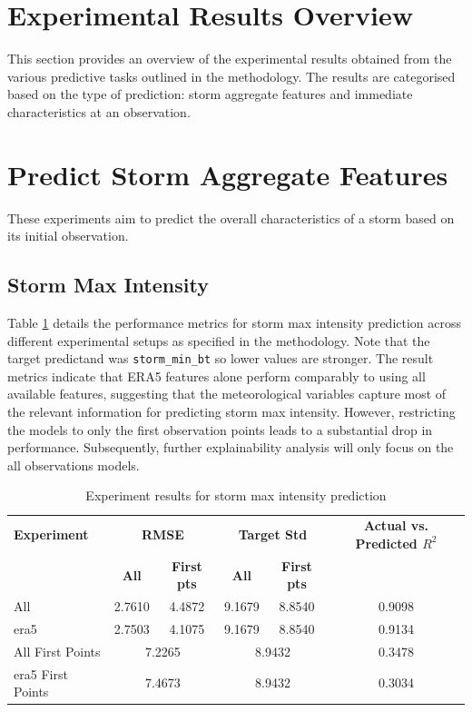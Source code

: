 \section{Experimental Results Overview}

This section provides an overview of the experimental results obtained from the various predictive tasks outlined in the methodology. The results are categorised based on the type of prediction: storm aggregate features and immediate characteristics at an observation. 

\section{Predict Storm Aggregate Features}

These experiments aim to predict the overall characteristics of a storm based on its initial observation.

\subsection{Storm Max Intensity}

Table \ref{tab:storm_max_intensity_results} details the performance metrics for storm max intensity prediction across different experimental setups as specified in the methodology. Note that the target predictand was \texttt{storm\_min\_bt} so lower values are stronger. The result metrics indicate that ERA5 features alone perform comparably to using all available features, suggesting that the meteorological variables capture most of the relevant information for predicting storm max intensity. However, restricting the models to only the first observation points leads to a substantial drop in performance. Subsequently, further explainability analysis will only focus on the all observations models.

\begin{table}[ht]
\centering
\caption{Experiment results for storm max intensity prediction}
\label{tab:storm_max_intensity_results}
\begin{tabular}{lccccc}
\hline
\textbf{Experiment} & \multicolumn{2}{c}{\textbf{RMSE}} & \multicolumn{2}{c}{\textbf{Target Std}} & \textbf{Actual vs. Predicted $R^2$} \\
\cline{2-5}
 & \textbf{All} & \textbf{First pts} & \textbf{All} & \textbf{First pts} &  \\
\hline
All              & 2.7610 & 4.4872 & 9.1679 & 8.8540 & 0.9098 \\
\acrshort{era5}             & 2.7503 & 4.1075 & 9.1679 & 8.8540 & 0.9134 \\
All First Points & \multicolumn{2}{c}{7.2265} & \multicolumn{2}{c}{8.9432} & 0.3478 \\
\acrshort{era5} First Points & \multicolumn{2}{c}{7.4673} & \multicolumn{2}{c}{8.9432} & 0.3034 \\
\hline
\end{tabular}
\end{table}


